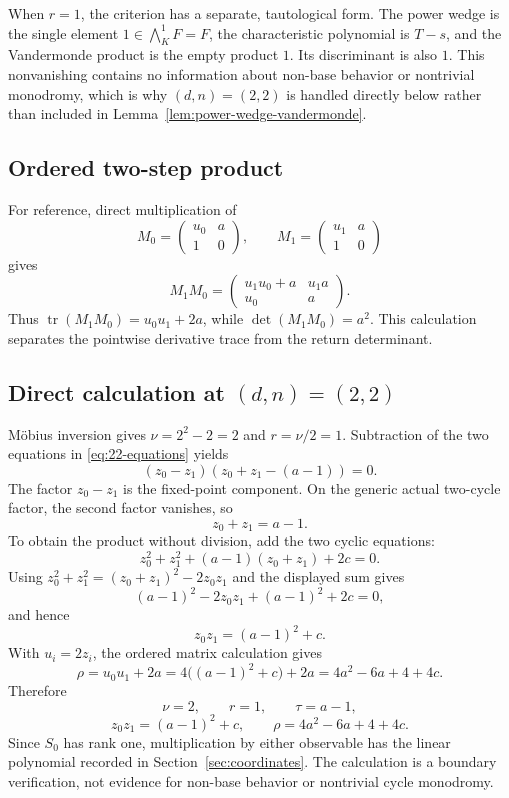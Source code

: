 \documentclass[11pt]{article}
\theoremstyle{definition}
\theoremstyle{remark}
\begin{document}
When $r=1$, the criterion has a separate, tautological form.  The power
wedge is the single element $1\in\bigwedge_K^1F=F$, the characteristic
polynomial is $T-s$, and the Vandermonde product is the empty product $1$.
Its discriminant is also $1$.  This nonvanishing contains no information
about non-base behavior or nontrivial monodromy, which is why
$(d,n)=(2,2)$ is handled directly below rather than included in
Lemma~\ref{lem:power-wedge-vandermonde}.

\subsection{Ordered two-step product}

For reference, direct multiplication of
\[
 M_0=\begin{pmatrix}u_0&a\\1&0\end{pmatrix},
 \qquad
 M_1=\begin{pmatrix}u_1&a\\1&0\end{pmatrix}
\]
gives
\[
 M_1M_0=
 \begin{pmatrix}
 u_1u_0+a&u_1a\\
 u_0&a
 \end{pmatrix}.
\]
Thus $\operatorname{tr}(M_1M_0)=u_0u_1+2a$, while
$\det(M_1M_0)=a^2$.  This calculation separates the pointwise derivative
trace from the return determinant.

\subsection{Direct calculation at $(d,n)=(2,2)$}

M\"obius inversion gives $\nu=2^2-2=2$ and $r=\nu/2=1$.  Subtraction of the
two equations in \eqref{eq:22-equations} yields
\[
 (z_0-z_1)(z_0+z_1-(a-1))=0.
\]
The factor $z_0-z_1$ is the fixed-point component.  On the generic actual
two-cycle factor, the second factor vanishes, so
\[
 z_0+z_1=a-1.
\]
To obtain the product without division, add the two cyclic equations:
\[
 z_0^2+z_1^2+(a-1)(z_0+z_1)+2c=0.
\]
Using $z_0^2+z_1^2=(z_0+z_1)^2-2z_0z_1$ and the displayed sum gives
\[
 (a-1)^2-2z_0z_1+(a-1)^2+2c=0,
\]
and hence
\[
 z_0z_1=(a-1)^2+c.
\]
With $u_i=2z_i$, the ordered matrix calculation gives
\[
 \rho=u_0u_1+2a
 =4\bigl((a-1)^2+c\bigr)+2a
 =4a^2-6a+4+4c.
\]
Therefore
\[
 \nu=2,\qquad r=1,\qquad \tau=a-1,
\]
\[
 z_0z_1=(a-1)^2+c,\qquad
 \rho=4a^2-6a+4+4c.
\]
Since $S_0$ has rank one, multiplication by either observable has the linear
polynomial recorded in Section~\ref{sec:coordinates}.  The calculation is a
boundary verification, not evidence for non-base behavior or nontrivial
cycle monodromy.



\end{document}
